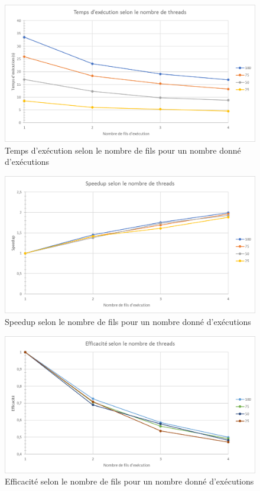 \documentclass{report}
\begin{document}
\begin{center}
	\begin{figure}[H]
		\includegraphics[scale=0.55]{Images/graph_temps.png}
		\caption{Temps d'exécution selon le nombre de fils pour un nombre donné d'exécutions}
	\end{figure}

	\begin{figure}[H]
		\includegraphics[scale=0.55]{Images/graph_speedup.png}
		\caption{Speedup selon le nombre de fils pour un nombre donné d'exécutions}
	\end{figure}

	\begin{figure}[H]
		\includegraphics[scale=0.55]{Images/graph_eff.png}
		\caption{Efficacité selon le nombre de fils pour un nombre donné d'exécutions}
	\end{figure}
\end{center}
\end{document}
